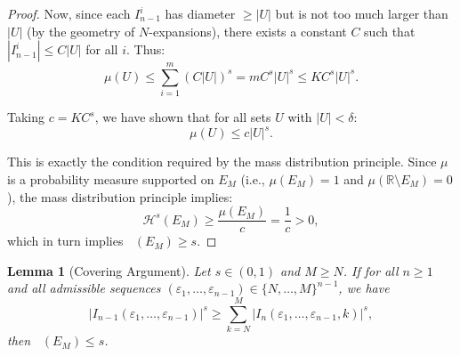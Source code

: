 \documentclass[12pt]{article}
\newtheorem{lemma}[theorem]{Lemma}
\numberwithin{equation}{section}
\DeclareMathOperator{\dimH}{dim_H}
\begin{document}
\begin{proof}
Now, since each $I_{n-1}^i$ has diameter $\geq |U|$ but is not too much larger than $|U|$ (by the geometry of $N$-expansions), there exists a constant $C$ such that $|I_{n-1}^i| \leq C |U|$ for all $i$. Thus:
\[
\mu(U) \leq \sum_{i=1}^m (C |U|)^s = m C^s |U|^s \leq K C^s |U|^s.
\]

Taking $c = K C^s$, we have shown that for all sets $U$ with $|U| < \delta$:
\[
\mu(U) \leq c |U|^s.
\]

This is exactly the condition required by the mass distribution principle. Since $\mu$ is a probability measure supported on $E_M$ (i.e., $\mu(E_M) = 1$ and $\mu(\mathbb{R} \setminus E_M) = 0$), the mass distribution principle implies:
\[
\mathcal{H}^s(E_M) \geq \frac{\mu(E_M)}{c} = \frac{1}{c} > 0,
\]
which in turn implies $\dimH(E_M) \geq s$.
\end{proof}

\begin{lemma}[Covering Argument] \label{lem:covering}
Let $s \in (0,1)$ and $M \geq N$. If for all $n \geq 1$ and all admissible sequences $(\varepsilon_1, \ldots, \varepsilon_{n-1}) \in \{N, \ldots, M\}^{n-1}$, we have
\begin{equation}
|I_{n-1}(\varepsilon_1, \ldots, \varepsilon_{n-1})|^s \geq \sum_{k=N}^{M} |I_n(\varepsilon_1, \ldots, \varepsilon_{n-1}, k)|^s, \label{4.2}
\end{equation}
then $\dimH(E_M) \leq s$.
\end{lemma}
\end{document}
